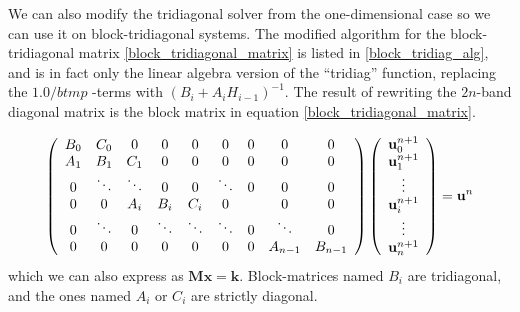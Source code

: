 
We can also modify the tridiagonal solver from the one-dimensional case so we can use it on block-tridiagonal systems. 
The modified algorithm for the block-tridiagonal matrix \ref{block_tridiagonal_matrix} is listed in \ref{block_tridiag_alg}, and is in fact only the linear algebra version of the ``tridiag'' function, replacing the $1.0/btmp$ -terms with $\left(B_i+A_iH_{i-1}\right)^{-1}$. The result of rewriting the $2n$-band diagonal matrix is the block matrix in equation \ref{block_tridiagonal_matrix}.

\begin{align}\label{block_tridiagonal_matrix}
   \left(\begin{array}{c c c c c c c c c}
        B_0 & C_0 &0 &0 &0 &0 &0 &0 &0\\
        A_1 & B_1 & C_1 &0 &0 &0 &0 &0 &0\\
        0&\ddots & \ddots & 0 & 0 & \ddots &0&0&0\\
        0 & 0&A_i & B_i & C_i& 0 &  &0&0\\
        0& \ddots&0&\ddots & \ddots & \ddots & 0 & \ddots &0\\
         0&0 &0 &0&0 &0&0&A_{n-1} & B_{n-1}
       \end{array}\right) \left(\begin{array}{c}
             \mathbf{u}^{n+1}_{0}\\
             \mathbf{u}^{n+1}_{1}\\
             \vdots\\
             \mathbf{u}^{n+1}_{i}\\
             \vdots\\
             \mathbf{u}^{n+1}_{n}
             \end{array}\right) = \mathbf{u}^{n}
\end{align}
which we can also express as $\mathbf M\mathbf{x} = \mathbf{k}$. Block-matrices named $B_i$ are tridiagonal, and the ones named $A_i$ or $C_i$ are strictly diagonal. 

